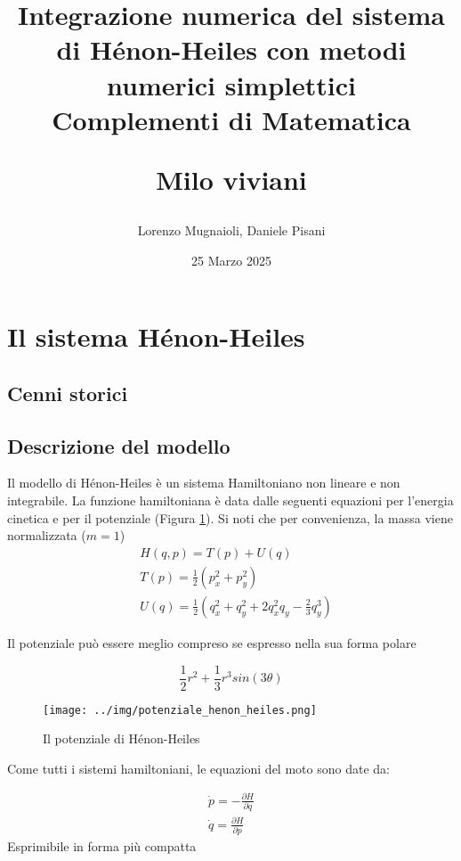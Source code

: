 \documentclass[a4paper, openright, twoside]{article}
\title{
	Integrazione numerica del sistema di Hénon-Heiles con metodi numerici simplettici\\
	\vspace{1cm}	
	Complementi di Matematica\\
	\begin{large}
	Milo viviani
	\end{large}

}
\date{25 Marzo 2025}
\author{Lorenzo Mugnaioli, Daniele Pisani}
\numberwithin{equation}{subsection}
\begin{document}
\maketitle
\clearpage
\tableofcontents
\clearpage

\section{Il sistema Hénon-Heiles}
\subsection{Cenni storici}

\subsection{Descrizione del modello}

Il modello di Hénon-Heiles è un sistema Hamiltoniano non lineare e non integrabile.
La funzione hamiltoniana è data dalle seguenti equazioni per l'energia cinetica e
per il potenziale (Figura \ref{img:potenzialehh}). Si noti che per convenienza, la massa viene normalizzata ($m=1$)
\begin{eqnarray}	
	&H(q,p) = T(p) + U(q) \label{eq:ham}\\
	&T(p) = \frac{1}{2}(p_x^2+p_y^2) \label{eq:cinetica}\\
	&U(q) = \frac{1}{2}(q_x^2+q_y^2+2q_x^2q_y-\frac{2}{3}q_y^3) \label{eq:potenziale}
\end{eqnarray}

Il potenziale può essere meglio compreso se espresso nella sua forma polare

\begin{equation}
	\frac{1}{2}r^2 + \frac{1}{3}r^3sin(3\theta)
\end{equation}

\begin{figure}[h!]
	\centering
	\texttt{[image: ../img/potenziale\_henon\_heiles.png]}
	\caption{Il potenziale di Hénon-Heiles}
	\label{img:potenzialehh}
\end{figure}

Come tutti i sistemi hamiltoniani, le equazioni del moto sono date da:

\begin{eqnarray}
	\dot{p} = -\frac{\partial H}{\partial q}\\
	\dot{q} = \frac{\partial H}{\partial p}
\end{eqnarray}
Esprimibile in forma più compatta
\end{document}
